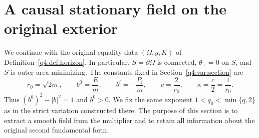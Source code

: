 \section{A causal stationary field on the original exterior}
\label{q4:adj:section}

We continue with the original equality data $(\Omega,g,K)$ of
Definition~\ref{q4:def:horizon}.  In particular, $S=\partial\Omega$ is connected,
$\theta_+=0$ on $S$, and $S$ is outer area-minimizing.  The constants fixed in
Section~\ref{q4:var:section} are
\[
 r_0=\sqrt{2m},\qquad b^0=\frac E m,\qquad b^i=-\frac{P_i}{m},
 \qquad c=\frac2{r_0},\qquad \kappa=\frac c2=\frac1{r_0}.
\]
Thus $(b^0)^2-|b|^2=1$ and $b^0>0$.  We fix the same exponent
$1<q_0<\min\{q,2\}$ as in the strict variation constructed there.
The purpose of this section is to extract a smooth field from the multiplier
and to retain all information about the original second fundamental form.


